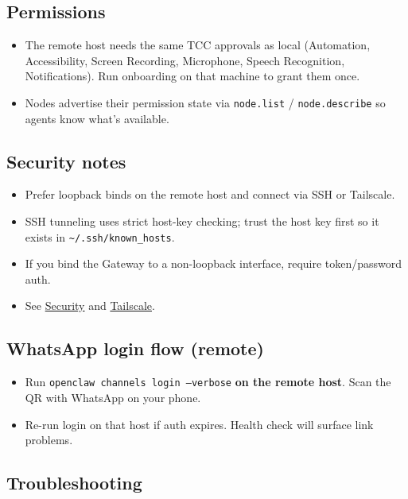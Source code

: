 \subsection{Permissions}


\begin{itemize}
  \item The remote host needs the same TCC approvals as local (Automation, Accessibility, Screen Recording, Microphone, Speech Recognition, Notifications). Run onboarding on that machine to grant them once.
  \item Nodes advertise their permission state via \texttt{node.list} / \texttt{node.describe} so agents know what’s available.
\end{itemize}


\subsection{Security notes}


\begin{itemize}
  \item Prefer loopback binds on the remote host and connect via SSH or Tailscale.
  \item SSH tunneling uses strict host-key checking; trust the host key first so it exists in \texttt{\textasciitilde{}/.ssh/known\_hosts}.
  \item If you bind the Gateway to a non-loopback interface, require token/password auth.
  \item See \href{/gateway/security}{Security} and \href{/gateway/tailscale}{Tailscale}.
\end{itemize}


\subsection{WhatsApp login flow (remote)}


\begin{itemize}
  \item Run \texttt{openclaw channels login --verbose} \textbf{on the remote host}. Scan the QR with WhatsApp on your phone.
  \item Re-run login on that host if auth expires. Health check will surface link problems.
\end{itemize}


\subsection{Troubleshooting}


